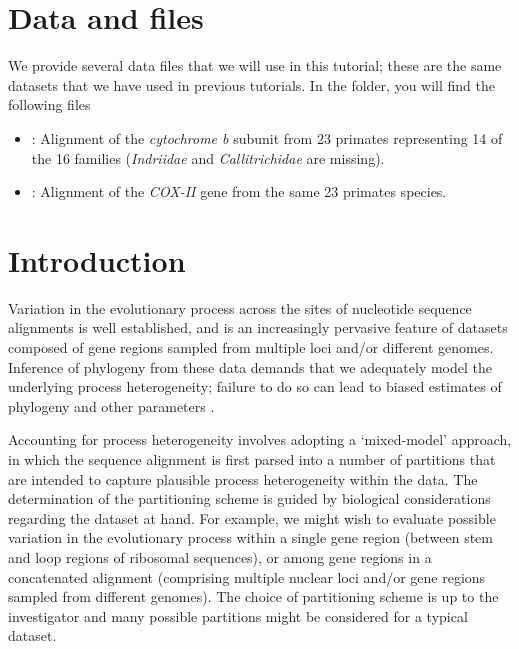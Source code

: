 \section{Data and files}

We provide several data files that we will use in this tutorial; these are the same datasets that we have used in previous tutorials.
In the  folder, you will find the following files
\begin{itemize}
\item
{}: Alignment of the \textit{cytochrome b} subunit from 23 primates representing 14 of the 16 families (\textit{Indriidae} and \textit{Callitrichidae} are missing).
\item
{}: Alignment of the \textit{COX-II} gene from the same 23 primates species.
\end{itemize}



\section{Introduction}

Variation in the evolutionary process across the sites of nucleotide sequence alignments is well established, and is an increasingly pervasive feature of datasets composed of gene regions sampled from multiple loci and/or different genomes.
Inference of phylogeny from these data demands that we adequately model the underlying process heterogeneity; failure to do so can lead to biased estimates of phylogeny and other parameters \citep{Brown2007}.

Accounting for process heterogeneity involves adopting a `mixed-model' approach, \citep{Ronquist2003} in which the sequence alignment is first parsed into a number of partitions that are intended to capture plausible process heterogeneity within the data.
The determination of the partitioning scheme is guided by biological considerations regarding the dataset at hand.
For example, we might wish to evaluate possible variation in the evolutionary process within a single gene region (\EG between stem and loop regions of ribosomal sequences), or among gene regions in a concatenated alignment (\EG comprising multiple nuclear loci and/or gene regions sampled from different genomes).
The choice of partitioning scheme is up to the investigator and many possible partitions might be considered for a typical dataset.

